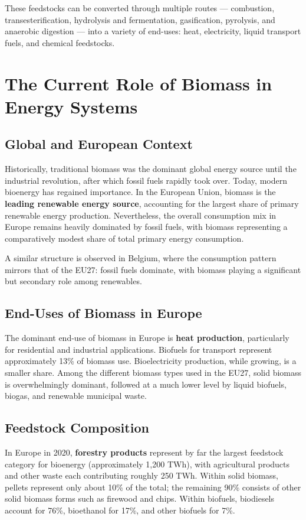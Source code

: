 These feedstocks can be converted through multiple routes — combustion, transesterification, hydrolysis and fermentation, gasification, pyrolysis, and anaerobic digestion — into a variety of end-uses: heat, electricity, liquid transport fuels, and chemical feedstocks.

\section{The Current Role of Biomass in Energy Systems}

\subsection{Global and European Context}

Historically, traditional biomass was the dominant global energy source until the industrial revolution, after which fossil fuels rapidly took over. Today, modern bioenergy has regained importance. In the European Union, biomass is the \textbf{leading renewable energy source}, accounting for the largest share of primary renewable energy production. Nevertheless, the overall consumption mix in Europe remains heavily dominated by fossil fuels, with biomass representing a comparatively modest share of total primary energy consumption.

A similar structure is observed in Belgium, where the consumption pattern mirrors that of the EU27: fossil fuels dominate, with biomass playing a significant but secondary role among renewables.

\subsection{End-Uses of Biomass in Europe}

The dominant end-use of biomass in Europe is \textbf{heat production}, particularly for residential and industrial applications. Biofuels for transport represent approximately 13\% of biomass use. Bioelectricity production, while growing, is a smaller share. Among the different biomass types used in the EU27, solid biomass is overwhelmingly dominant, followed at a much lower level by liquid biofuels, biogas, and renewable municipal waste.

\subsection{Feedstock Composition}

In Europe in 2020, \textbf{forestry products} represent by far the largest feedstock category for bioenergy (approximately 1,200 TWh), with agricultural products and other waste each contributing roughly 250 TWh. Within solid biomass, pellets represent only about 10\% of the total; the remaining 90\% consists of other solid biomass forms such as firewood and chips. Within biofuels, biodiesels account for 76\%, bioethanol for 17\%, and other biofuels for 7\%.

